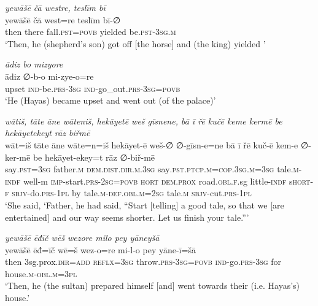 \ea \label{KŠ.103}
\textit{yewāšē čā westre, teslīm bī} \\ 
\gll yewāšē čā west=re teslīm bī-∅ \\ 
 then there fall\textsc{.pst}\textsc{=\textsc{povb}} yielded be\textsc{.pst}\textsc{-3sg}\textsc{.m} \\ 
\glt `Then, he (shepherd’s son) got off [the horse] and (the king) yielded  '
\z 
 
\ea \label{ŽH.4}
\textit{ādiz bo mizyore} \\ 
\gll ādiz ∅-b-o mi-zye-o=re \\ 
 upset \textsc{ind-}be\textsc{.prs}\textsc{-3sg} \textsc{ind-}go\_out\textsc{.prs}\textsc{-3sg}\textsc{=\textsc{povb}} \\ 
\glt `He (Hayas) became upset and went out (of the palace)'
\z 
 
\ea \label{ŽH.27}
\textit{wātiš, tāte āne wāteniš, hekāyetē weš gīsnene, bā ī řē kučē keme kermē be hekāyetekeyt rāz biřmē} \\ 
\gll wāt=iš tāte āne wāte=n=iš hekāyet-ē weš-∅ ∅-gīsn-e=ne bā ī řē kuč-ē kem-e ∅-ker-mē be hekāyet-ekey=t rāz ∅-biř-mē \\ 
 say\textsc{.pst}\textsc{=3sg} father\textsc{.m} \textsc{dem.dist}\textsc{.dir}\textsc{.m}\textsc{.3sg} say\textsc{.pst}\textsc{.ptcp}\textsc{.m}\textsc{=cop}\textsc{.3sg}\textsc{.m}\textsc{=3sg} tale\textsc{.m}\textsc{-indf} well-m \textsc{imp-}start\textsc{.prs}-\textsc{2sg}\textsc{=\textsc{povb}} \textsc{hort} \textsc{dem.prox} road\textsc{.obl}\textsc{\textsc{.f}}.sg little\textsc{-indf} s\textsc{hort}\textsc{-f} \textsc{sbjv-}do\textsc{.prs}\textsc{-1pl} by tale\textsc{.m}\textsc{-def}\textsc{.obl}\textsc{.m}\textsc{=\textsc{2sg}} tale\textsc{.m} \textsc{sbjv-}cut\textsc{.prs}\textsc{-1pl} \\ 
\glt `She said, ‘Father, he had said, “Start [telling] a good tale, so that we [are entertained] and our way seems shorter. Let us finish your tale.”'
\z 
 
\ea \label{ŽH.72}
\textit{yewāšē ēđīč wēš wezore milo pey yāneyšā} \\ 
\gll yewāšē ēđ=īč wē=š wez-o=re mi-l-o pey yāne-ī=šā \\ 
 then 3sg.prox\textsc{.dir}\textsc{=add} \textsc{reflx}\textsc{=3sg} throw\textsc{.prs}\textsc{-3sg}\textsc{=\textsc{povb}} \textsc{ind-}go\textsc{.prs}\textsc{-3sg} for house\textsc{.m}\textsc{-obl}\textsc{.m}\textsc{=3pl} \\ 
\glt `Then, he (the sultan) prepared himself [and] went towards their (i.e. Hayas’s) house.'
\z 
 
